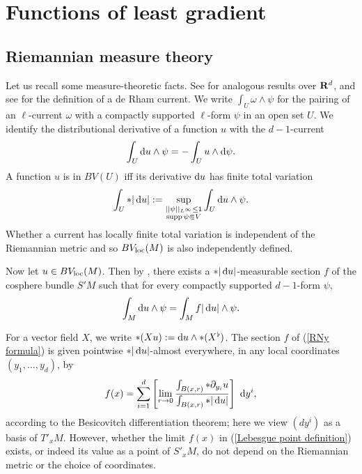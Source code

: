 \section{Functions of least gradient}\label{LeastGradientFunctions}
\subsection{Riemannian measure theory}
Let us recall some measure-theoretic facts.
See \cite[Chapter 1]{Giusti77} for analogous results over $\mathbf{R}^d$, and see \cite{simon1983GMT} for the definition of a de Rham current.
We write $\int_U \omega \wedge \psi$ for the pairing of an $\ell$-current $\omega$ with a compactly supported $\ell$-form $\psi$ in an open set $U$.
We identify the distributional derivative of a function $u$ with the $d-1$-current
$$\int_U \mathop{}\!\mathrm{d} u \wedge \psi = -\int_U u \wedge \mathop{}\!\mathrm{d} \psi.$$
A function $u$ is in $BV(U)$ iff its derivative $\mathop{}\!\mathrm{d} u$ has finite total variation
\begin{equation}\label{total variation}
\int_U *|\mathop{}\!\mathrm{d} u| := \sup_{\substack{||\psi||_{L^\infty} \leq 1\\\operatorname{supp} \psi \Subset V}} \int_U \mathop{}\!\mathrm{d} u \wedge \psi.
\end{equation}
Whether a current has locally finite total variation is independent of the Riemannian metric and so $BV_{\mathrm{loc}}(M)$ is also independently defined.

Now let $u \in BV_{\mathrm{loc}}(M)$.
Then by \cite[Theorem 4.14]{simon1983GMT}, there exists a $*|\mathop{}\!\mathrm{d} u|$-measurable section $f$ of the cosphere bundle $S'M$ such that for every compactly supported $d-1$-form $\psi$,
\begin{equation}\label{RNy formula}
\int_M \mathop{}\!\mathrm{d} u \wedge \psi = \int_M f|\mathop{}\!\mathrm{d} u| \wedge \psi.
\end{equation}

For a vector field $X$, we write $*(Xu) := \mathop{}\!\mathrm{d} u \wedge *(X^\flat)$.
The section $f$ of (\ref{RNy formula}) is given pointwise $*|\mathop{}\!\mathrm{d} u|$-almost everywhere, in any local coordinates $(y_1, \dots, y_d)$, by
\begin{equation}\label{Lebesgue point definition}
    f(x) = \sum_{i = 1}^d \left[\lim_{r \to 0} \frac{\int_{B(x, r)} *\partial_{y_i} u}{\int_{B(x, r)} *|\mathop{}\!\mathrm{d} u|}\right] ~\mathop{}\!\mathrm{d} y^i,
\end{equation}
according to the Besicovitch differentiation theorem; here we view $(dy^i)$ as a basis of $T'_xM$.
However, whether the limit $f(x)$ in (\ref{Lebesgue point definition}) exists, or indeed its value as a point of $S'_xM$, do not depend on the Riemannian metric or the choice of coordinates.

